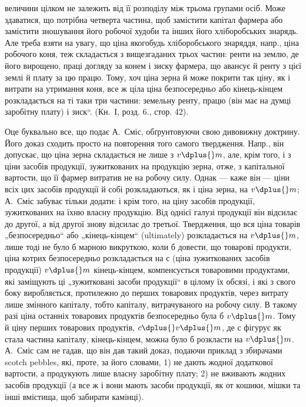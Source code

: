 \parcont{}  %
величини цілком не залежить від її розподілу між трьома групами осіб.
Може здаватися, що потрібна четверта частина, щоб замістити капітал
фармера або замістити зношування його робочої худоби та інших
його хліборобських знарядь. Але треба взяти на увагу, що ціна якогобудь
хліборобського знаряддя, напр., ціна робочого коня, теж складається
з вищезгаданих трьох частин: ренти на землю, де його вирощено,
праці догляду за конем і зиску фармера, що авансує й ренту з цієї
землі й плату за цю працю. Тому, хоч ціна зерна й може покрити так
ціну, як і витрати на утримання коня, все ж ціла ціна безпосередньо
або кінець-кінцем розкладається на ті таки три частини: земельну ренту,
працю (він має на думці заробітну плату) і зиск“. (Кн.~І, розд. 6.,
стор. 42).

Оце буквально все, що подає А.~Сміс, обґрунтовуючи свою дивовижну
доктрину. Його доказ сходить просто на повторення того самого
твердження. Напр., він допускає, що ціна зерна складається не лише з
$v \dplus{} m$, але, крім того, і з ціни засобів продукції, зужиткованих на продукцію
зерна, отже, з капітальної вартости, що її фармер витратив не
на робочу силу. Однак — каже він — ціни всіх цих засобів продукції й
собі розкладаються, як і ціна зерна, на $v \dplus{} m$; А.~Сміс забуває тільки
додати: і крім того, на ціну засобів продукції, зужиткованих на їхню
власну продукцію. Від однієї галузі продукції він відсилає до другої, а
від другої знову відсилає до третьої. Твердження, що вся ціна товарів
„безпосередньо“ або „кінець-кінцем“ (ultimately) розкладається на $v \dplus{} m$,
лише тоді не було б марною викруткою, коли б довести, що товарові
продукти, ціна котрих безпосередньо розкладається на с (ціна зужиткованих
засобів продукції) \dplus{} $v \dplus{} m$ кінець-кінцем, компенсується товаровими
продуктами, які заміщують ці „зужитковані засоби продукції“ в
цілому їх обсязі, і які з свого боку виробляється, протилежно до перших
товарових продуктів, через витрату лише змінного капіталу, тобто
капіталу, витрачуваного на робочу силу. В такому разі ціна останніх
товарових продуктів безпосередньо була б \deq{} $v \dplus{} m$. Тому й ціну перших
товарових продуктів, $c \dplus{} v \dplus{} m$, де с фігурує як стала частина
капіталу, кінець-кінцем, можна було б розкласти на $v \dplus{} m$. А.~Сміс сам
не гадав, що він дав такий доказ, подаючи приклад з збирачами scotch
pebbles, які, проте, за його словами, 1) не дають жодної додаткової вартости,
а продукують лише власну заробітну плату; 2) не вживають жодних
засобів продукції (а все ж і вони мають засоби продукції, як от
кошики, мішки та інші вмістища, щоб забирати камінці).

